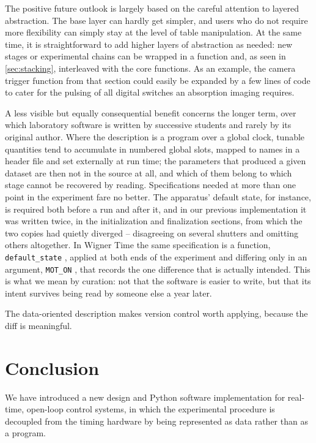 \documentclass{SciPost}
\newcommand{\python}[1]{%
  \texttt{#1}%
}
\begin{document}
The positive future outlook is largely based on the careful attention to layered abstraction. The base layer can hardly get simpler, and users who do not require more flexibility can simply stay at the level of table manipulation. At the same time, it is straightforward to add higher layers of abstraction as needed: new stages or experimental chains can be wrapped in a function and, as seen in \cref{sec:stacking}, interleaved with the core functions. As an example, the camera trigger function from that section could easily be expanded by a few lines of code to cater for the pulsing of all digital switches an absorption imaging requires.
 
A less visible but equally consequential benefit concerns the longer term, over which laboratory software is written by successive students and rarely by its original author. Where the description is a program over a global clock, tunable quantities tend to accumulate in numbered global slots, mapped to names in a header file and set externally at run time; the parameters that produced a given dataset are then not in the source at all, and which of them belong to which stage cannot be recovered by reading. Specifications needed at more than one point in the experiment fare no better. The apparatus’ default state, for instance, is required both before a run and after it, and in our previous implementation it was written twice, in the initialization and finalization sections, from which the two copies had quietly diverged – disagreeing on several shutters and omitting others altogether. In Wigner Time the same specification is a function, \python{default_state}, applied at both ends of the experiment and differing only in an argument, \python{MOT_ON}, that records the one difference that is actually intended. This is what we mean by curation: not that the software is easier to write, but that its intent survives being read by someone else a year later.
 
The data-oriented description makes version control worth applying, because the diff is meaningful.
 
\section{Conclusion}
\label{sec:conclusion}
We have introduced a new design and Python software implementation for real-time,
open-loop control systems, in which the experimental procedure is decoupled from
the timing hardware by being represented as data rather than as a program.
 
\end{document}
